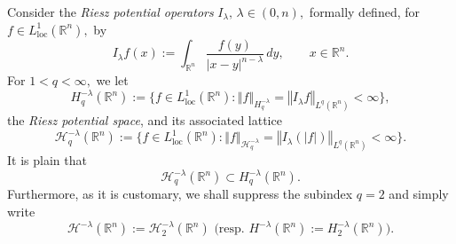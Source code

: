 \documentclass[11pt, a4paper,leqno]{amsart}
\newtheorem{theorem}{Theorem}
\theoremstyle{plain}
\numberwithin{equation}{section}
\theoremstyle{definition}
\theoremstyle{remark}
\def\R{\mathbb{R}}
\begin{document}
Consider the \emph{Riesz potential operators}
$I_{\lambda}, \, \lambda \in (0, n),$ formally defined, for $f\in L_{\text{loc}}^{1}(\mathbb{R}%
^{n}),$ by
\begin{equation*}
I_{\lambda}f(x):=\int_{\mathbb{R}^{n}}\frac{f(y)}{|x-y|^{n-\lambda}%
}\,dy,\qquad x\in\mathbb{R}^{n}.
\end{equation*}
For $1<q<\infty,$ we let
\begin{equation}
H_{q}^{-\lambda}(\mathbb{R}^{n}):=\{f\in L_{\text{loc}}^{1}(\mathbb{R}%
^{n}):\left\Vert f\right\Vert _{H_{q}^{-\lambda}}=\left\Vert I_{\lambda
}f\right\Vert _{L^{q}(\mathbb{R}^{n})}<\infty\},\label{rpot0}%
\end{equation}
the \emph{Riesz potential space}, and its associated lattice%
\begin{equation}
\mathcal{H}_{q}^{-\lambda}(\mathbb{R}^{n}):=\{f\in L_{\text{loc}}%
^{1}(\mathbb{R}^{n}):\left\Vert f\right\Vert _{\mathcal{H}_{q}^{-\lambda}%
}=\left\Vert I_{\lambda} (\left\vert f\right\vert) \right\Vert _{L^{q}%
(\mathbb{R}^{n})}<\infty\}.\label{rpot1}%
\end{equation}
It is plain that%
\begin{equation*}
\mathcal{H}_{q}^{-\lambda}(\mathbb{R}^{n})\subset H_{q}^{-\lambda}%
(\mathbb{R}^{n}).
\end{equation*}
Furthermore, as it is customary, we shall suppress the subindex $q=2$ and
simply write%
\begin{equation}\label{SLat}
\mathcal{H}^{-\lambda}(\mathbb{R}^{n}):=\mathcal{H}_{2}^{-\lambda}%
(\mathbb{R}^{n})\text{ \ \ (resp. }H^{-\lambda}(\mathbb{R}^{n}):=H_{2}%
^{-\lambda}(\mathbb{R}^{n})).
\end{equation}








%
%
\end{document}
